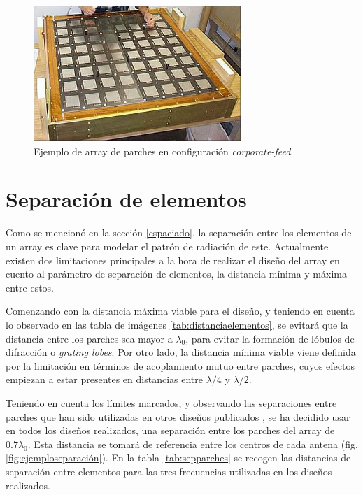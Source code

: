 \begin{figure}[p]
    \centering
        \includegraphics[width=0.7\textwidth]{archivos/array/arrayraro}
        \caption{Ejemplo de array de parches en configuración \textit{corporate-feed}. \cite{NASA2008}}
        \label{fig:nasafoto}
\end{figure}

\section{Separación de elementos}
\par Como se mencionó en la sección \ref{espaciado}, la separación entre los elementos de un array es clave para modelar el patrón de radiación de este. Actualmente existen dos limitaciones principales a la hora de realizar el diseño del array en cuento al parámetro de separación de elementos, la distancia mínima y máxima entre estos.
\\
\par Comenzando con la distancia máxima viable para el diseño, y teniendo en cuenta lo observado en las tabla de imágenes \ref{tab:distanciaelementos}, se evitará que la distancia entre los parches sea mayor a $\lambda_{0}$, para evitar la formación de lóbulos de difracción o \textit{grating lobes}. Por otro lado, la distancia mínima viable viene definida por la limitación en términos de acoplamiento mutuo entre parches, cuyos efectos empiezan a estar presentes en distancias entre $\lambda/4$ y $\lambda/2$.
\\
\par Teniendo en cuenta los límites marcados, y observando las separaciones entre parches que han sido utilizadas en otros diseños publicados \cite{Waterhouse2010, Bertol2017}, se ha decidido usar en todos los diseños realizados, una separación entre los parches del array de $0.7\lambda_{0}$. Esta distancia se tomará de referencia entre los centros de cada antena (fig. \ref{fig:ejemploseparación}). En la tabla \ref{tab:sepparches} se recogen las distancias de separación entre elementos para las tres frecuencias utilizadas en los diseños realizados. 

